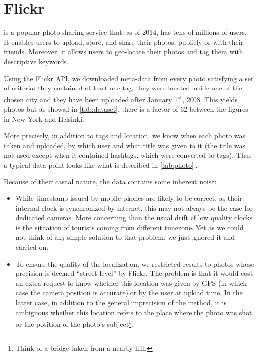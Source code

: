 \section{Flickr}
\label{sec:flickr}

\flickr{} is a popular photo sharing service that, as of 2014, has tens of
millions of users. It enables users to upload, store, and share their photos,
publicly or with their friends. Moreover, it allows users to geo-locate their
photos and tag them with descriptive keywords. 

Using the Flickr API, we downloaded meta-data from every photo satisfying a set
of criteria: they contained at least one tag, they were located inside one of
the chosen city and they have been uploaded after January
1\textsuperscript{st}, 2008. This yields  photos but as
showed in \autoref{tab:dataset}, there is a factor of 62 between the figures in
New-York and Helsinki.

More precisely, in addition to tags and location, we know when each photo was
taken and uploaded, by which user and what title was given to it (the title
was not used except when it contained hashtags, which were converted to tags).
Thus a typical data point looks like what is described in \autoref{tab:photo}
.

Because of their casual nature, the data contains some inherent noise:
\begin{itemize}
	\item While timestamp issued by mobile phones are likely to be correct,
 as their internal clock is synchronized by internet, this may not
 always be the case for dedicated cameras. More concerning than the usual
 drift of low quality clocks is the situation of tourists coming from
 different timezone. Yet as we could not think of any simple solution to
 that problem, we just ignored it and carried on.
	\item To ensure the quality of the localization, we restricted results to
 photos whose precision is deemed \enquote{street level} by Flickr. The
 problem is that it would cost an extra request to know
 whether this location was given by GPS (in which case the camera
 position is accurate) or by the user at upload time. In the latter
 case, in addition to the general imprecision of the method, it is
 ambiguous whether this location refers to the place where the photo was
 shot or the position of the photo's subject\footnote{Think of a bridge
 taken from a nearby hill.}.
\end{itemize}
